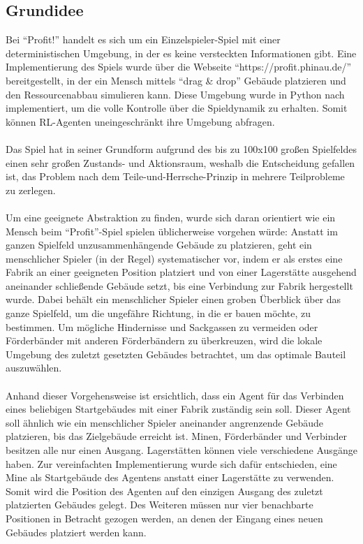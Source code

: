 \subsection{Grundidee}
Bei “Profit!” handelt es sich um ein Einzelspieler-Spiel mit einer deterministischen Umgebung, in der es keine versteckten Informationen gibt. Eine Implementierung des Spiels wurde über die Webseite “https://profit.phinau.de/” bereitgestellt, in der ein Mensch mittels “drag \& drop” Gebäude platzieren und den Ressourcenabbau simulieren kann. Diese Umgebung wurde in Python nach implementiert, um die volle Kontrolle über die Spieldynamik zu erhalten. Somit können RL-Agenten uneingeschränkt ihre Umgebung abfragen.
\\\\
Das Spiel hat in seiner Grundform aufgrund des bis zu 100x100 großen Spielfeldes einen sehr großen Zustands- und Aktionsraum, weshalb die Entscheidung gefallen ist, das Problem nach dem Teile-und-Herrsche-Prinzip in mehrere Teilprobleme zu zerlegen.
\\\\
Um eine geeignete Abstraktion zu finden, wurde sich daran orientiert wie ein Mensch beim “Profit”-Spiel spielen üblicherweise vorgehen würde: Anstatt im ganzen Spielfeld unzusammenhängende Gebäude zu platzieren, geht ein menschlicher Spieler (in der Regel) systematischer vor, indem er als erstes eine Fabrik an einer geeigneten Position platziert und von einer Lagerstätte ausgehend aneinander schließende Gebäude setzt, bis eine Verbindung zur Fabrik hergestellt wurde. Dabei behält ein menschlicher Spieler einen groben Überblick über das ganze Spielfeld, um die ungefähre Richtung, in die er bauen möchte, zu bestimmen. Um mögliche Hindernisse und Sackgassen zu vermeiden oder Förderbänder mit anderen Förderbändern zu überkreuzen, wird die lokale Umgebung des zuletzt gesetzten Gebäudes betrachtet, um das optimale Bauteil auszuwählen. 
\\\\
Anhand dieser Vorgehensweise ist ersichtlich, dass ein Agent für das Verbinden eines beliebigen Startgebäudes mit einer Fabrik zuständig sein soll. Dieser Agent soll ähnlich wie ein menschlicher Spieler aneinander angrenzende Gebäude platzieren, bis das Zielgebäude  erreicht ist. 
Minen, Förderbänder und Verbinder besitzen alle nur einen Ausgang. Lagerstätten können viele verschiedene Ausgänge haben. 
Zur vereinfachten Implementierung wurde sich dafür entschieden, eine Mine als Startgebäude des Agentens anstatt einer Lagerstätte zu verwenden. 
Somit wird die Position des Agenten auf den einzigen Ausgang des zuletzt platzierten Gebäudes gelegt. Des Weiteren müssen nur vier benachbarte Positionen in Betracht gezogen werden, an denen der Eingang eines neuen Gebäudes platziert werden kann. 

